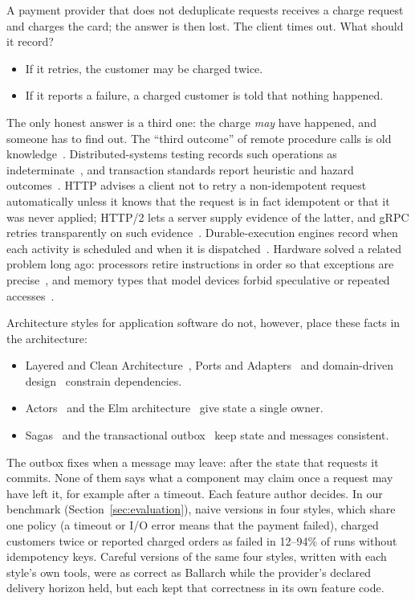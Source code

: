 \documentclass[11pt]{article}
\theoremstyle{definition}
\theoremstyle{plain}
\begin{document}
A payment provider that does not deduplicate requests receives a charge request and charges the card; the answer is then lost. The client times out. What should it record?
\begin{itemize}[nosep]
  \item If it retries, the customer may be charged twice.
  \item If it reports a failure, a charged customer is told that nothing happened.
\end{itemize}
The only honest answer is a third one: the charge \emph{may} have happened, and someone has to find out. The ``third outcome'' of remote procedure calls is old knowledge~\citep{BirrellNelson1984}. Distributed-systems testing records such operations as indeterminate~\citep{Jepsen,KingsburyAlvaro2020Elle}, and transaction standards report heuristic and hazard outcomes~\citep{XA1991}. HTTP advises a client not to retry a non-idempotent request automatically unless it knows that the request is in fact idempotent or that it was never applied; HTTP/2 lets a server supply evidence of the latter, and gRPC retries transparently on such evidence~\citep{rfc9110,rfc9113,grpcA6}. Durable-execution engines record when each activity is scheduled and when it is dispatched~\citep{TemporalEvents}. Hardware solved a related problem long ago: processors retire instructions in order so that exceptions are precise~\citep{SmithPleszkun1985}, and memory types that model devices forbid speculative or repeated accesses~\citep{ArmARM}.

Architecture styles for application software do not, however, place these facts in the architecture:
\begin{itemize}[nosep]
  \item Layered and Clean Architecture~\citep{Martin2017Clean}, Ports and Adapters~\citep{Cockburn2005} and domain-driven design~\citep{Evans2003} constrain dependencies.
  \item Actors~\citep{HewittBishopSteiger1973,Armstrong2003,Bykov2011Orleans} and the Elm architecture~\citep{ElmGuide} give state a single owner.
  \item Sagas~\citep{GarciaMolinaSalem1987} and the transactional outbox~\citep{Richardson2018} keep state and messages consistent.
\end{itemize}
The outbox fixes when a message may leave: after the state that requests it commits. None of them says what a component may claim once a request may have left it, for example after a timeout. Each feature author decides. In our benchmark (Section~\ref{sec:evaluation}), naive versions in four styles, which share one policy (a timeout or I/O error means that the payment failed), charged customers twice or reported charged orders as failed in 12--94\% of runs without idempotency keys. Careful versions of the same four styles, written with each style's own tools, were as correct as Ballarch while the provider's declared delivery horizon held, but each kept that correctness in its own feature code.
\end{document}
